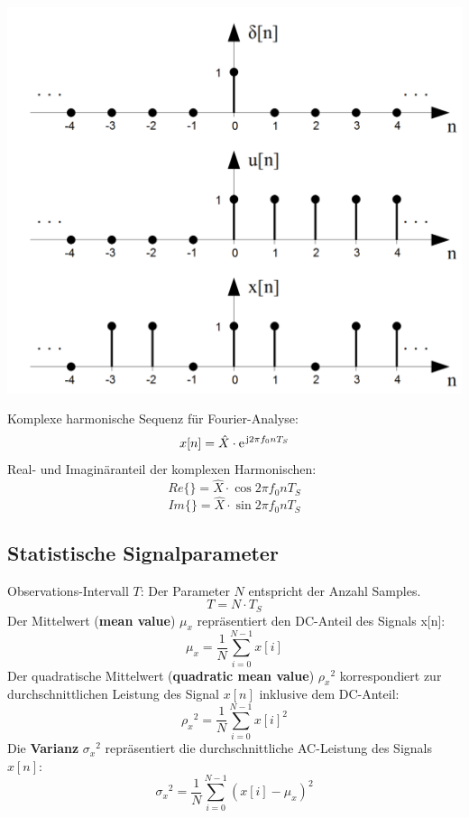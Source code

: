 \begin{center}
\includegraphics[scale=.7]{../fig/basic_signals}
\end{center}
Komplexe harmonische Sequenz für Fourier-Analyse:
\[ x[n] = \hat{X} \cdot \e^{\im 2 \pi f_0 n T_S} \]
Real- und Imaginäranteil der komplexen Harmonischen:
\[ Re\{\} = \hat{X} \cdot \cos 2 \pi f_0 n T_S \]
\[ Im\{\} = \hat{X} \cdot \sin 2 \pi f_0 n T_S \]

\subsection{Statistische Signalparameter}
Observations-Intervall $T$: Der Parameter $N$ entspricht der Anzahl Samples.
\[ T = N \cdot T_S \]
Der Mittelwert (\textbf{mean value}) $\mu_x$ repräsentiert
den DC-Anteil des Signals x[n]:
\[ \mu_x = \frac{1}{N} \sum_{i=0}^{N-1}x[i] \]
Der quadratische Mittelwert (\textbf{quadratic mean value}) ${\rho_x}^2$
korrespondiert zur durchschnittlichen Leistung des Signal $x[n]$
inklusive dem DC-Anteil:
\[ {\rho_x}^2 = \frac{1}{N} \sum_{i=0}^{N-1} x[i]^2 \]
Die \textbf{Varianz} ${\sigma_x}^2$ repräsentiert die durchschnittliche
AC-Leistung des Signals $x[n]$:
\[ {\sigma_x}^2 = \frac{1}{N} \sum_{i=0}^{N-1}(x[i] - \mu_x)^2 \]

